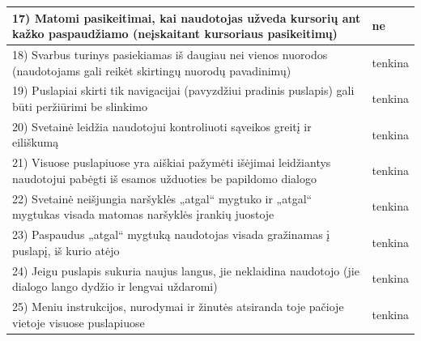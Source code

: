 \documentclass{VUMIFPSkursinis}
\begin{document}
\begin{longtable}{ |p{}|p{2cm}| }
	17) Matomi pasikeitimai, kai naudotojas užveda kursorių ant kažko paspaudžiamo (neįskaitant kursoriaus pasikeitimų) & ne \\ \hline
	18) Svarbus turinys pasiekiamas iš daugiau nei vienos nuorodos (naudotojams gali reikėt skirtingų nuorodų pavadinimų) & tenkina \\ \hline
	19) Puslapiai skirti tik navigacijai (pavyzdžiui pradinis puslapis) gali būti peržiūrimi be slinkimo & tenkina \\ \hline
	20) Svetainė leidžia naudotojui kontroliuoti sąveikos greitį ir eiliškumą & tenkina \\ \hline
	21) Visuose puslapiuose yra aiškiai pažymėti išėjimai leidžiantys naudotojui pabėgti iš esamos užduoties be papildomo dialogo & tenkina \\ \hline
	22) Svetainė neišjungia naršyklės „atgal“ mygtuko ir „atgal“ mygtukas visada matomas naršyklės įrankių juostoje & tenkina \\ \hline
	23) Paspaudus „atgal“ mygtuką naudotojas visada gražinamas į puslapį, iš kurio atėjo & tenkina \\ \hline
	24) Jeigu puslapis sukuria naujus langus, jie neklaidina naudotojo (jie dialogo lango dydžio ir lengvai uždaromi) & tenkina \\ \hline
	25) Meniu instrukcijos, nurodymai ir žinutės atsiranda toje pačioje vietoje visuose puslapiuose & tenkina \\ \hline
\end{longtable}
\label{NavigacijosirIALentelėPrad}
\addtocounter{table}{-1}
\end{document}

